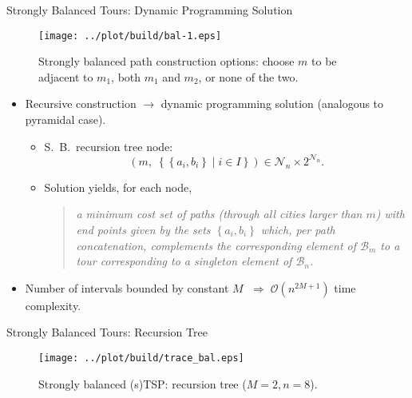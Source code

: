 \documentclass[
  size=8pt,
  style=klope,
  paper=screen,
  mode=present,
  nohandoutpagebreaks,
  pauseslide,
  hlsections,
  fleqn,
]{powerdot}
\def\eqitspace{\vspace{-5mm}}
\begin{document}
\begin{slide}[toc=]{Strongly Balanced Tours: Dynamic Programming Solution}
    \begin{figure}[H]
      \centering
      \texttt{[image: ../plot/build/bal-1.eps]}
      \caption{
        Strongly balanced path construction options: choose $m$ to be adjacent to $m_1$, both $m_1$ and $m_2$, or none of the two.
     }
    \end{figure}
  \begin{itemize}
  \item
    Recursive construction $\rightarrow$ dynamic programming solution (analogous to pyramidal case).
    \begin{itemize}
    \item
      S.\ B.\ recursion tree node:
      \begin{equation}
      \left(m, \;
      \left\{\left\{a_i,b_i\right\} \mid i \in I\right\}\right)
       \in \mathcal{N}_n \times 2^{\mathcal{N}_n}.
      \end{equation}
      \eqitspace%
    \item
      Solution yields, for each node,
      \vspace{2mm}
      \begin{quote}
      {\itshape
        a minimum cost set of paths
        (through all cities larger than $m$)
        with end points given by the sets $\left\{a_i,b_i\right\}$
        which, per path concatenation,
        complements the corresponding element of $\mathcal{B}_m$
        to a tour corresponding to a singleton element of $\mathcal{B}_n$.
      }
      \end{quote}
      \vspace{2mm}
    \end{itemize}
    \eqitspace%
  \item
    Number of intervals bounded by constant $M$ $\;\Rightarrow\;
    \mathcal{O}\left(n^{2M+1}\right)$ time complexity.
  \end{itemize}
\end{slide}

\begin{slide}[toc=]{Strongly Balanced Tours: Recursion Tree}
  \begin{figure}[H]
    \centering
    \texttt{[image: ../plot/build/trace\_bal.eps]}
    \caption{Strongly balanced (s)TSP: recursion tree ($M=2,n=8$).}
  \end{figure}
\end{slide}
\end{document}
